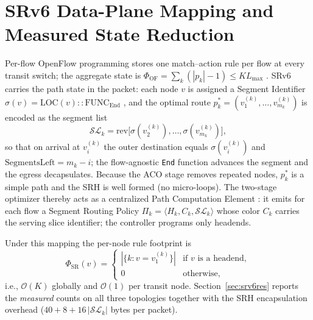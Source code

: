 \documentclass[journal]{IEEEtran}
\begin{document}
\section{SRv6 Data-Plane Mapping and Measured State Reduction}
\label{sec:srv6}
Per-flow OpenFlow programming stores one match--action rule per flow at
every transit switch; the aggregate state is
$\Phi_{\mathrm{OF}}=\sum_{k}(|p_k|-1)\le K L_{\max}$
\cite{mckeown2008}. SRv6 \cite{rfc8402,rfc8754,rfc8986} carries the path
state in the packet: each node $v$ is assigned a Segment Identifier
$\sigma(v)=\mathrm{LOC}(v){:}{:}\mathrm{FUNC}_{\mathrm{End}}$
\cite{rfc8986}, and the optimal route
$p^{*}_k=(v^{(k)}_1,\ldots,v^{(k)}_{m_k})$ is encoded as the segment list
\begin{equation}
\mathcal{SL}_k=\mathrm{rev}\bigl[\sigma(v^{(k)}_2),\ldots,
\sigma(v^{(k)}_{m_k})\bigr],
\label{eq:seglist}
\end{equation}
so that on arrival at $v^{(k)}_i$ the outer destination equals
$\sigma(v^{(k)}_i)$ and $\mathrm{SegmentsLeft}=m_k-i$; the flow-agnostic
\texttt{End} function advances the segment and the egress decapsulates.
Because the ACO stage removes repeated nodes, $p^{*}_k$ is a simple path and
the SRH is well formed (no micro-loops). The two-stage optimizer thereby acts
as a centralized Path Computation Element \cite{rfc4655}: it emits for each
flow a Segment Routing Policy $\Pi_k=\langle H_k, C_k, \mathcal{SL}_k\rangle$
\cite{rfc9256} whose color $C_k$ carries the serving slice identifier; the
controller programs only headends.

Under this mapping the per-node rule footprint is
\begin{equation}
\Phi_{\mathrm{SR}}(v)=\begin{cases}
|\{k: v=v^{(k)}_1\}| & \text{if $v$ is a headend},\\
0 & \text{otherwise},
\end{cases}
\label{eq:srstate}
\end{equation}
i.e., $\mathcal{O}(K)$ globally and $\mathcal{O}(1)$ per transit node.
Section~\ref{sec:srv6res} reports the \emph{measured} counts on all three
topologies together with the SRH encapsulation overhead
($40+8+16\,|\mathcal{SL}_k|$ bytes per packet).

\end{document}
